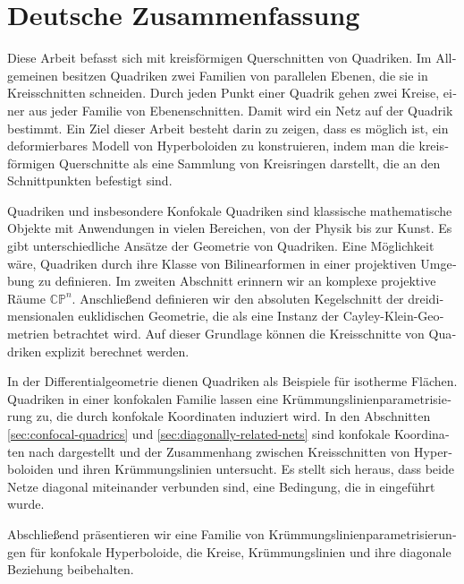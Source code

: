 \documentclass[10pt, a4paper]{article}
\theoremstyle{BoldTopSpacing}
\theoremstyle{BoldTopSpacing}
\theoremstyle{BoldTopSpacing}
\theoremstyle{BoldTopBottomSpacing}
\theoremstyle{BoldTopSpacing}
\theoremstyle{BoldTopBottomSpacing}
\theoremstyle{remark}
\begin{document}
\section*{Deutsche Zusammenfassung}
\begin{otherlanguage}{german}
Diese Arbeit befasst sich mit kreisförmigen Querschnitten von Quadriken. Im Allgemeinen besitzen Quadriken zwei Familien von parallelen Ebenen, die sie in Kreisschnitten schneiden. Durch jeden Punkt einer Quadrik gehen zwei Kreise, einer aus jeder Familie von Ebenenschnitten. Damit wird ein Netz auf der Quadrik bestimmt. Ein Ziel dieser Arbeit besteht darin zu zeigen, dass es möglich ist, ein deformierbares Modell von Hyperboloiden zu konstruieren, indem man die kreisförmigen Querschnitte als eine Sammlung von Kreisringen darstellt, die an den Schnittpunkten befestigt sind. \par
Quadriken und insbesondere Konfokale Quadriken sind klassische mathematische Objekte mit Anwendungen in vielen Bereichen, von der Physik bis zur Kunst. Es gibt unterschiedliche Ansätze der Geometrie von Quadriken. Eine Möglichkeit wäre, Quadriken durch ihre Klasse von Bilinearformen in einer projektiven Umgebung zu definieren. Im zweiten Abschnitt erinnern wir an komplexe projektive Räume $\mathbb{C}\mathbb{P}^{n}$. Anschließend definieren wir den absoluten Kegelschnitt der dreidimensionalen euklidischen Geometrie, die als eine Instanz der Cayley-Klein-Geometrien betrachtet wird. Auf dieser Grundlage können die Kreisschnitte von Quadriken explizit berechnet werden. \par
In der Differentialgeometrie dienen Quadriken als Beispiele für isotherme Flächen. Quadriken in einer konfokalen Familie lassen eine Krümmungslinienparametrisierung zu, die durch konfokale Koordinaten induziert wird. In den Abschnitten \ref{sec:confocal-quadrics} und \ref{sec:diagonally-related-nets} sind konfokale Koordinaten nach \cite{DiscretizationConfocalQuadricsI} dargestellt und der Zusammenhang zwischen Kreisschnitten von Hyperboloiden und ihren Krümmungslinien untersucht. Es stellt sich heraus, dass beide Netze diagonal miteinander verbunden sind, eine Bedingung, die in \cite{MutuallyDiagonalNets2019} eingeführt wurde. \par
Abschließend präsentieren wir eine Familie von Krümmungslinienparametrisierungen für konfokale Hyperboloide, die Kreise, Krümmungslinien und ihre diagonale Beziehung beibehalten.
\end{otherlanguage}
\pagebreak
\end{document}
